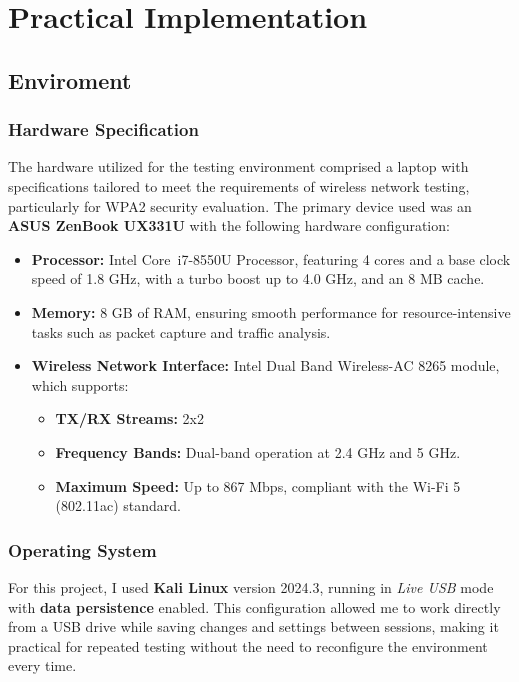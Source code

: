 \part{Practical Implementation}
\chapter{Enviroment}
\section{Hardware Specification}
The hardware utilized for the testing environment comprised a laptop with specifications tailored to meet the requirements of wireless network testing, particularly for WPA2 security evaluation. The primary device used was an \textbf{ASUS ZenBook UX331U} with the following hardware configuration:

\begin{itemize}
    \item \textbf{Processor:} Intel\textsuperscript{\textregistered} Core\texttrademark\ i7-8550U Processor, featuring 4 cores and a base clock speed of 1.8 GHz, with a turbo boost up to 4.0 GHz, and an 8 MB cache.
    \item \textbf{Memory:} 8 GB of RAM, ensuring smooth performance for resource-intensive tasks such as packet capture and traffic analysis.
    \item \textbf{Wireless Network Interface:} Intel\textsuperscript{\textregistered} Dual Band Wireless-AC 8265 module, which supports:
    \begin{itemize}
        \item \textbf{TX/RX Streams:} 2x2
        \item \textbf{Frequency Bands:} Dual-band operation at 2.4 GHz and 5 GHz.
        \item \textbf{Maximum Speed:} Up to 867 Mbps, compliant with the Wi-Fi 5 (802.11ac) standard.
    \end{itemize}
\end{itemize}

\section{Operating System}

For this project, I used \textbf{Kali Linux} version 2024.3, running in \textit{Live USB} mode with \textbf{data persistence} enabled. This configuration allowed me to work directly from a USB drive while saving changes and settings between sessions, making it practical for repeated testing without the need to reconfigure the environment every time.

